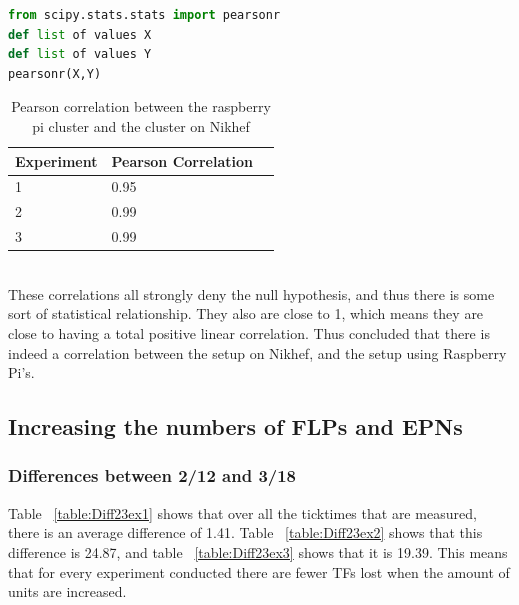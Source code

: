 \begin{lstlisting}[frame=single,language=Python,caption={Pearson correlation calculation in Python},label={lst:PearsonInPython}]
from scipy.stats.stats import pearsonr
def list of values X
def list of values Y
pearsonr(X,Y)
\end{lstlisting}

\begin{table}[h!]
\begin{tabular}{| l | l | l |}
\hline
Experiment & Pearson Correlation \\ \hline
1 & 0.95 \\ \hline
2 & 0.99 \\ \hline
3 & 0.99 \\ \hline
\end{tabular}
\caption{Pearson correlation between the raspberry pi cluster and the cluster on Nikhef}
\label{table:PearsonCor}
\end{table}

~\\ These correlations all strongly deny the null hypothesis, and thus there is some sort of statistical relationship. They also are close to 1, which means they are close to having a total positive linear correlation. Thus concluded that there is indeed a correlation between the setup on Nikhef, and the setup using Raspberry Pi's.

\subsection{Increasing the numbers of FLPs and EPNs}

\subsubsection*{Differences between 2/12 and 3/18}
Table ~\ref{table:Diff23ex1} shows that over all the ticktimes that are measured, there is an average difference of 1.41. Table ~\ref{table:Diff23ex2} shows that this difference is 24.87, and table ~\ref{table:Diff23ex3} shows that it is 19.39. This means that for every experiment conducted there are fewer TFs lost when the amount of units are increased.


